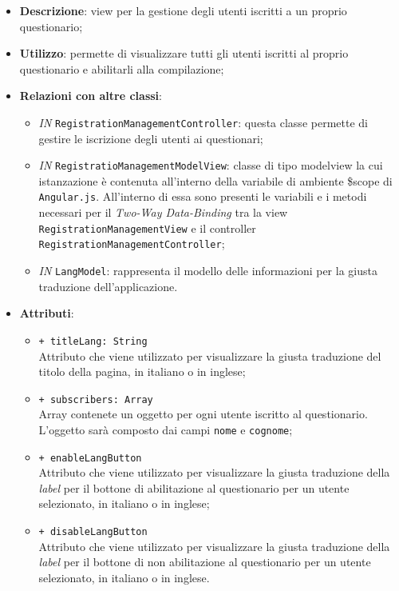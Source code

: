 \begin{itemize}
	\item \textbf{Descrizione}: view per la gestione degli utenti iscritti a un proprio questionario;
	\item \textbf{Utilizzo}: permette di visualizzare tutti gli utenti iscritti al proprio questionario e abilitarli alla compilazione;
	\item \textbf{Relazioni con altre classi}:
	\begin{itemize}
		\item \textit{IN} \texttt{RegistrationManagementController}: questa classe permette di gestire le iscrizione degli utenti ai questionari; 
		\item \textit{IN} \texttt{RegistratioManagementModelView}: classe di tipo modelview la cui istanzazione è contenuta all'interno della variabile di ambiente \$scope di \texttt{Angular.js}. All'interno di essa sono presenti le variabili e i metodi necessari per il \textit{Two-Way Data-Binding} tra la view \texttt{RegistrationManagementView} e il controller \texttt{RegistrationManagementController}; 
		\item \textit{IN} \texttt{LangModel}: rappresenta il modello delle informazioni per la giusta traduzione dell'applicazione.
	\end{itemize}
		\item \textbf{Attributi}:
		\begin{itemize}
			\item \texttt{+ titleLang: String} \\ Attributo che viene utilizzato per visualizzare la giusta traduzione del titolo della pagina, in italiano o in inglese; 
			\item \texttt{+ subscribers: Array} \\ Array contenete un oggetto per ogni utente iscritto al questionario. L'oggetto sarà composto dai campi \texttt{nome} e \texttt{cognome};
			\item \texttt{+ enableLangButton} \\ Attributo che viene utilizzato per visualizzare la giusta traduzione della \textit{label} per il bottone di abilitazione al questionario per un utente selezionato, in italiano o in inglese;
			\item \texttt{+ disableLangButton} \\ Attributo che viene utilizzato per visualizzare la giusta traduzione della \textit{label} per il bottone di non abilitazione al questionario per un utente selezionato, in italiano o in inglese.
		\end{itemize}
\end{itemize}


